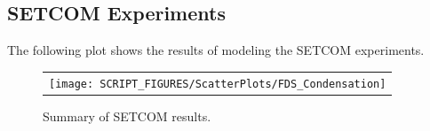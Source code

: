 \subsection{SETCOM Experiments}
The following plot shows the results of modeling the SETCOM experiments.

\begin{figure}[h!]
        \begin{center}
                \begin{tabular}{c}
                        \texttt{[image: SCRIPT\_FIGURES/ScatterPlots/FDS\_Condensation]}
                \end{tabular}
        \end{center}
        \caption[Summary of SETCOM results]{Summary of SETCOM results.}
        \label{SETCOM_summary}
\end{figure}

